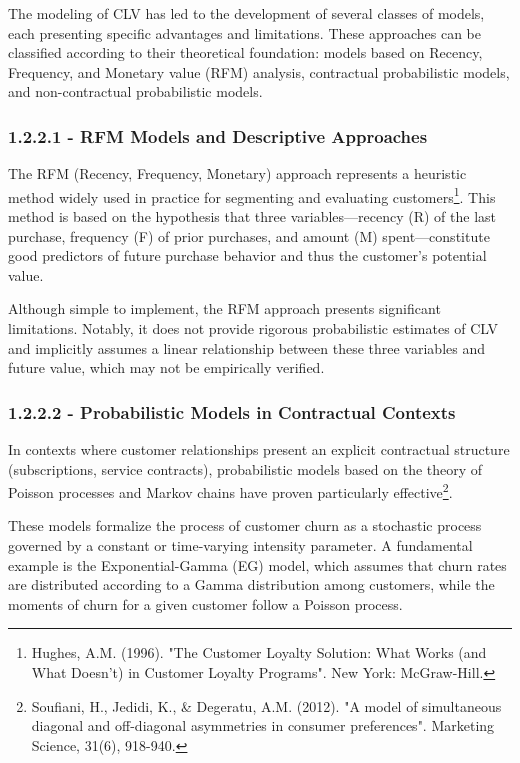\documentclass[12pt,a4paper,oneside]{report}
\begin{document}
The modeling of CLV has led to the development of several classes of models, each presenting specific advantages and limitations. These approaches can be classified according to their theoretical foundation: models based on Recency, Frequency, and Monetary value (RFM) analysis, contractual probabilistic models, and non-contractual probabilistic models.

\subsubsection{1.2.2.1 - RFM Models and Descriptive Approaches}

The RFM (Recency, Frequency, Monetary) approach represents a heuristic method widely used in practice for segmenting and evaluating customers\footnote{Hughes, A.M. (1996). "The Customer Loyalty Solution: What Works (and What Doesn't) in Customer Loyalty Programs". New York: McGraw-Hill.}. This method is based on the hypothesis that three variables—recency (R) of the last purchase, frequency (F) of prior purchases, and amount (M) spent—constitute good predictors of future purchase behavior and thus the customer's potential value.

Although simple to implement, the RFM approach presents significant limitations. Notably, it does not provide rigorous probabilistic estimates of CLV and implicitly assumes a linear relationship between these three variables and future value, which may not be empirically verified.

\subsubsection{1.2.2.2 - Probabilistic Models in Contractual Contexts}

In contexts where customer relationships present an explicit contractual structure (subscriptions, service contracts), probabilistic models based on the theory of Poisson processes and Markov chains have proven particularly effective\footnote{Soufiani, H., Jedidi, K., \& Degeratu, A.M. (2012). "A model of simultaneous diagonal and off-diagonal asymmetries in consumer preferences". Marketing Science, 31(6), 918-940.}.

These models formalize the process of customer churn as a stochastic process governed by a constant or time-varying intensity parameter. A fundamental example is the Exponential-Gamma (EG) model, which assumes that churn rates are distributed according to a Gamma distribution among customers, while the moments of churn for a given customer follow a Poisson process.
\end{document}
